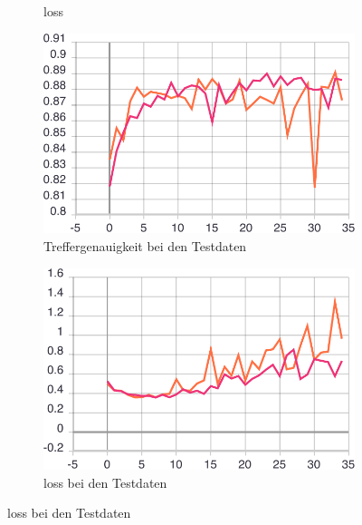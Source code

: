 \begin{figure}[h!]
\begin{subfigure}[b]{0.5\linewidth}
    \caption{loss} 
    \label{image-class-results:b} 
    \vspace{2ex}
  \end{subfigure} 
  \begin{subfigure}[b]{0.5\linewidth}
    \centering
    \includegraphics[width=0.75\linewidth]{graphics/image-classification-results/val_acc.pdf} 
    \caption{Treffergenauigkeit bei den Testdaten} 
    \label{image-class-results:c} 
  \end{subfigure}%
  \begin{subfigure}[b]{0.5\linewidth}
    \centering
    \includegraphics[width=0.75\linewidth]{graphics/image-classification-results/val_loss.pdf} 
    \caption{loss bei den Testdaten} 
    \label{image-class-results:d} 
  \end{subfigure}
  \centering
\end{figure}




